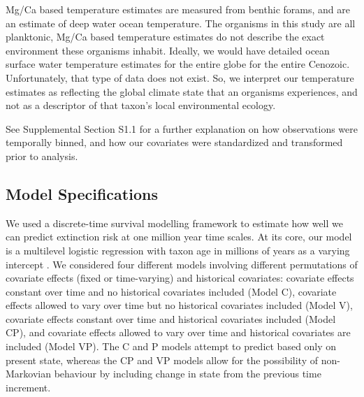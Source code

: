 \documentclass[12pt,letterpaper]{article}
\begin{document}
\begin{refsection}
Mg/Ca based temperature estimates are measured from benthic forams, and are an estimate of deep water ocean temperature. The organisms in this study are all planktonic, Mg/Ca based temperature estimates do not describe the exact environment these organisms inhabit. Ideally, we would have detailed ocean surface water temperature estimates for the entire globe for the entire Cenozoic. Unfortunately, that type of data does not exist. So, we interpret our temperature estimates as reflecting the global climate state that an organisms experiences, and not as a descriptor of that taxon's local environmental ecology.

See Supplemental Section S1.1 for a further explanation on how observations were temporally binned, and how our covariates were standardized and transformed prior to analysis.




\subsection{Model Specifications}

We used a discrete-time survival modelling framework to estimate how well we can predict extinction risk at one million year time scales. At its core, our model is a multilevel logistic regression with taxon age in millions of years as a varying intercept \citep{Tutz2016}. We considered four different models involving different permutations of covariate effects (fixed or time-varying) and historical covariates: covariate effects constant over time and no historical covariates included (Model C), covariate effects allowed to vary over time but no historical covariates included (Model V), covariate effects constant over time and historical covariates included (Model CP), and covariate effects allowed to vary over time and historical covariates are included (Model VP). The C and P models attempt to predict based only on present state, whereas the CP and VP models allow for the possibility of non-Markovian behaviour by including change in state from the previous time increment.


\end{refsection}
\end{document}
